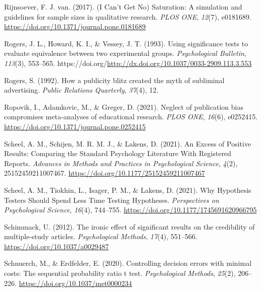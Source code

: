 \documentclass[
  letterpaper,
  DIV=11,
  numbers=noendperiod]{scrreprt}
\newlength{\cslhangindent}
\newlength{\cslentryspacingunit} %
\newenvironment{CSLReferences}[2] %
 {%
  \setlength{\parindent}{0pt}
  \ifodd #1
  \let\oldpar\par
  \def\par{\hangindent=\cslhangindent\oldpar}
  \fi
  \setlength{\parskip}{#2\cslentryspacingunit}
 }%
 {}
\begin{document}
\begin{CSLReferences}{1}{0}
\leavevmode{}%
Rijnsoever, F. J. van. (2017). ({I Can}'t {Get No}) {Saturation}: {A}
simulation and guidelines for sample sizes in qualitative research.
\emph{PLOS ONE}, \emph{12}(7), e0181689.
\url{https://doi.org/10.1371/journal.pone.0181689}

\leavevmode{}%
Rogers, J. L., Howard, K. I., \& Vessey, J. T. (1993). Using
significance tests to evaluate equivalence between two experimental
groups. \emph{Psychological Bulletin}, \emph{113}(3), 553--565.
https://doi.org/\url{http://dx.doi.org/10.1037/0033-2909.113.3.553}

\leavevmode{}%
Rogers, S. (1992). How a publicity blitz created the myth of subliminal
advertising. \emph{Public Relations Quarterly}, \emph{37}(4), 12.

\leavevmode{}%
Ropovik, I., Adamkovic, M., \& Greger, D. (2021). Neglect of publication
bias compromises meta-analyses of educational research. \emph{PLOS ONE},
\emph{16}(6), e0252415.
\url{https://doi.org/10.1371/journal.pone.0252415}

\leavevmode{}%
Scheel, A. M., Schijen, M. R. M. J., \& Lakens, D. (2021). An {Excess}
of {Positive Results}: {Comparing} the {Standard Psychology Literature
With Registered Reports}. \emph{Advances in Methods and Practices in
Psychological Science}, \emph{4}(2), 25152459211007467.
\url{https://doi.org/10.1177/25152459211007467}

\leavevmode{}%
Scheel, A. M., Tiokhin, L., Isager, P. M., \& Lakens, D. (2021). Why
{Hypothesis Testers Should Spend Less Time Testing Hypotheses}.
\emph{Perspectives on Psychological Science}, \emph{16}(4), 744--755.
\url{https://doi.org/10.1177/1745691620966795}

\leavevmode{}%
Schimmack, U. (2012). The ironic effect of significant results on the
credibility of multiple-study articles. \emph{Psychological Methods},
\emph{17}(4), 551--566. \url{https://doi.org/10.1037/a0029487}

\leavevmode{}%
Schnuerch, M., \& Erdfelder, E. (2020). Controlling decision errors with
minimal costs: {The} sequential probability ratio t test.
\emph{Psychological Methods}, \emph{25}(2), 206--226.
\url{https://doi.org/10.1037/met0000234}


\end{CSLReferences}
\end{document}
